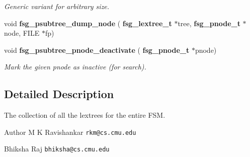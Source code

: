 \begin{DoxyCompactItemize}
\begin{DoxyCompactList}\small\item\em Generic variant for arbitrary size. \end{DoxyCompactList}\item 
\mbox{\label{fsg__lextree_8c_a1d3204e8ce39bcb66c68b9ef1e2acb7d}} 
void {\bfseries fsg\+\_\+psubtree\+\_\+dump\+\_\+node} (\textbf{ fsg\+\_\+lextree\+\_\+t} $\ast$tree, \textbf{ fsg\+\_\+pnode\+\_\+t} $\ast$node, F\+I\+LE $\ast$fp)
\item 
\mbox{\label{fsg__lextree_8c_a6dc55ff3873855fb7b2c0390aa072516}} 
void \textbf{ fsg\+\_\+psubtree\+\_\+pnode\+\_\+deactivate} (\textbf{ fsg\+\_\+pnode\+\_\+t} $\ast$pnode)
\begin{DoxyCompactList}\small\item\em Mark the given pnode as inactive (for search). \end{DoxyCompactList}\end{DoxyCompactItemize}


\subsection{Detailed Description}
The collection of all the lextrees for the entire F\+SM. 

\begin{DoxyAuthor}{Author}
M K Ravishankar {\tt rkm@cs.\+cmu.\+edu} 

Bhiksha Raj {\tt bhiksha@cs.\+cmu.\+edu} 
\end{DoxyAuthor}
